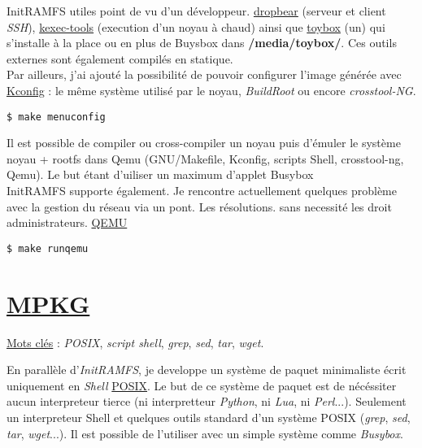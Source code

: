 \documentclass[a4paper]{article}
\begin{document}
InitRAMFS utiles point de vu d'un développeur.
\href{https://matt.ucc.asn.au/dropbear/dropbear.html}{dropbear} (serveur et client \textit{SSH}), \href{http://git.kernel.org/cgit/utils/kernel/kexec/kexec-tools.git/}{kexec-tools} (execution d'un noyau à chaud) ainsi que \href{http://landley.net/toybox/}{toybox} (un) qui s'installe à la place ou en plus de Buysbox dans \textbf{/media/toybox/}. Ces outils externes sont également compilés en statique.\\

Par ailleurs, j'ai ajouté la possibilité de pouvoir configurer l'image générée avec \href{http://ymorin.is-a-geek.org/projects/kconfig-frontends}{Kconfig} : le même système utilisé par le noyau, \textit{BuildRoot} ou encore \textit{crosstool-NG}.
\begin{verbatim}
$ make menuconfig
\end{verbatim}

Il est possible de compiler ou cross-compiler un noyau puis d'émuler le système noyau + rootfs dans Qemu (GNU/Makefile, Kconfig, scripts Shell, crosstool-ng, Qemu).
Le but étant d'uiliser un maximum d'applet Busybox\\

InitRAMFS supporte également. Je rencontre actuellement quelques problème avec la gestion du réseau via un pont. Les résolutions. sans necessité les droit administrateurs.
\href{http://wiki.qemu.org}{QEMU}
\begin{verbatim}
$ make runqemu
\end{verbatim}

\section{\href{https://github.com/gazoo74/mpkg/}{MPKG}}

\underline{Mots clés} : \textit{POSIX}, \textit{script shell}, \textit{grep}, \textit{sed}, \textit{tar}, \textit{wget}.

En parallèle d'\textit{InitRAMFS}, je developpe un système de paquet minimaliste écrit uniquement en \textit{Shell} \href{https://fr.wikipedia.org/wiki/POSIX}{POSIX}. Le but de ce système de paquet est de nécéssiter aucun interpreteur tierce (ni interpretteur \textit{Python}, ni \textit{Lua}, ni \textit{Perl}...). Seulement un interpreteur Shell et quelques outils standard d'un système POSIX (\textit{grep}, \textit{sed}, \textit{tar}, \textit{wget}...). Il est possible de l'utiliser avec un simple système comme \textit{Busybox}.\\
\end{document}
